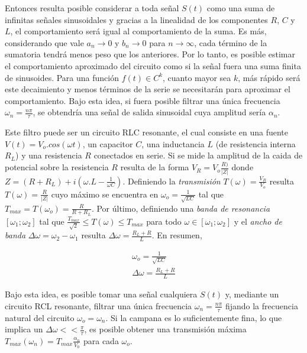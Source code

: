 \documentclass[11pt,a4paper]{article}
\begin{document}
Entonces resulta posible considerar a toda señal $S(t)$ como una suma de infinitas señales sinusoidales y gracias a la linealidad de los componentes $R$, $C$ y $L$, el comportamiento será igual al comportamiento de la suma. Es más, considerando que vale $a_n \rightarrow 0$ y $b_n \rightarrow 0$ para $n \rightarrow \infty$, cada término de la sumatoria tendrá menos peso que los anteriores. Por lo tanto, es posible estimar el comportamiento aproximado del circuito como si la señal fuera una suma finita de sinusoides. Para una función $f(t)\in C^k$, cuanto mayor sea $k$, más rápido será este decaimiento y menos términos de la serie se necesitarán para aproximar el comportamiento. Bajo esta idea, si fuera posible filtrar una única frecuencia $\omega_n = \frac{n\pi}{\tau}$, se obtendría una señal de salida sinusoidal cuya amplitud sería $\alpha_n$. 

Este filtro puede ser un circuito RLC resonante, el cual consiste en una fuente $V(t) = V_o.cos(\omega t)$, un capacitor $C$, una inductancia $L$ (de resistencia interna $R_L$) y una resistencia $R$ conectados en serie. Si se mide la amplitud de la caida de potencial sobre la resistencia $R$ resulta de la forma $V_R = V_o\frac{R)}{|Z|}$ donde $Z = (R+R_L)+i(\omega.L-\frac{1}{\omega C})$. Definiendo la \textit{transmisión} $T(\omega) = \frac{V_R}{V_o}$ resulta $T(\omega) = \frac{R}{|Z|}$ cuyo máximo se encuentra en $\omega_o = \frac{1}{\sqrt{LC}}$ tal que $T_{max} = T(\omega_o) = \frac{R}{R+R_L}$. Por último, definiendo una \textit{banda de resonancia} $[\omega_1;\omega_2]$ tal que $\frac{T_{max}}{\sqrt{2}} \leq T(\omega) \leq T_{max}$ para todo $\omega \in [\omega_1;\omega_2]$ y el \textit{ancho de banda} $\Delta\omega = \omega_2 - \omega_1$ resulta $\Delta\omega = \frac{R_L+R}{L}$. En resumen,

\begin{equation}
\begin{split}
\omega_o = \frac{1}{\sqrt{LC}}\\
\Delta\omega = \frac{R_L+R}{L}
\end{split}
\label{eq:resonante}
\end{equation}

Bajo esta idea, es posible tomar una señal cualquiera $S(t)$ y, mediante un circuito RCL resonante, filtrar una única frecuencia $\omega_n = \frac{n\pi}{\tau}$ fijando la frecuencia natural del circuito $\omega_o = \omega_n$. Si la campana es lo suficientemente fina, lo que implica un $\Delta \omega << \frac{\pi}{\tau}$, es posible obtener una transmisión máxima $T_{max}(\omega_n) = T_{max}\frac{\alpha_n}{V_0}$ para cada $\omega_o$.
\end{document}
